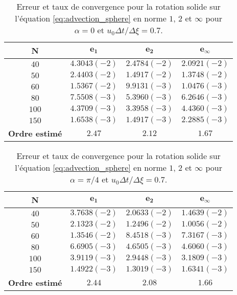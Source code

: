 \begin{table}[htbp]
\begin{center}
\begin{tabular}{|c||c|c|c|}
\hline
\textbf{N}  & $\mathbf{e_1}$ & $\mathbf{e_2}$ & $\mathbf{e_{\infty}}$\\
\hline
\hline
$40$  & $4.3043 (-2)$ & $2.4784 (-2)$ & $2.0921 (-2)$ \\
$50$  & $2.4403 (-2)$ & $1.4917 (-2)$ & $1.3748 (-2)$ \\
$60$  & $1.5367 (-2)$ & $9.9131 (-3)$ & $1.0476 (-3)$ \\
$80$  & $7.5508 (-3)$ & $5.3960 (-3)$ & $6.2646 (-3)$ \\
$100$  & $4.3709 (-3)$ & $3.3958 (-3)$ & $4.4360 (-3)$ \\
$150$  & $1.6538 (-3)$ & $1.4917 (-3)$ & $2.2885 (-3)$ \\
\hline 
\hline
\textbf{Ordre estimé}& $2.47$ & $2.12$ & $1.67$\\
\hline
\end{tabular}
\end{center}
\caption{Erreur et taux de convergence pour la rotation solide sur l'équation \eqref{eq:advection_sphere} en norme $1$, $2$ et $\infty$ pour $\alpha = 0$ et $u_0 \Delta t / \Delta \xi = 0.7$.}
\label{tab:rate1_bump}
\end{table} 

\begin{table}[htbp]
\begin{center}
\begin{tabular}{|c||c|c|c|}
\hline
\textbf{N}  & $\mathbf{e_1}$ & $\mathbf{e_2}$ & $\mathbf{e_{\infty}}$\\
\hline
\hline
$40$  & $3.7638 (-2)$ & $2.0633 (-2)$ & $1.4639 (-2)$ \\
$50$  & $2.1323 (-2)$ & $1.2496 (-2)$ & $1.0056 (-2)$ \\
$60$  & $1.3546 (-2)$ & $8.4518 (-3)$ & $7.3167 (-3)$ \\
$80$  & $6.6905 (-3)$ & $4.6505 (-3)$ & $4.6060 (-3)$ \\
$100$  & $3.9119 (-3)$ & $2.9448 (-3)$ & $3.1809 (-3)$ \\
$150$  & $1.4922 (-3)$ & $1.3019 (-3)$ & $1.6341 (-3)$ \\
\hline 
\hline
\textbf{Ordre estimé}& $2.44$ & $2.08$ & $1.66$\\
\hline
\end{tabular}
\end{center}
\caption{Erreur et taux de convergence pour la rotation solide sur l'équation \eqref{eq:advection_sphere} en norme $1$, $2$ et $\infty$ pour $\alpha = \pi / 4$ et $u_0 \Delta t / \Delta \xi = 0.7$.}
\label{tab:rate2_bump}
\end{table} 

